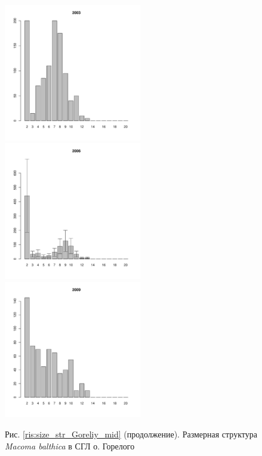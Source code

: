 \documentclass[12pt, a4paper]{article}
\begin{document}
\begin{figure}[h]
\begin{multicols}{3}
\hfill
\includegraphics[width=60mm]{../White_Sea/Luvenga_Goreliy/middle2_2003_.pdf}
\hfill
\includegraphics[width=60mm]{../White_Sea/Luvenga_Goreliy/middle2_2006_.pdf}
\hfill
\includegraphics[width=60mm]{../White_Sea/Luvenga_Goreliy/middle2_2009_.pdf}
\end{multicols}



\begin{center}
Рис. \ref{ris:size_str_Goreliy_mid} (продолжение). Размерная структура {\it Macoma balthica} в СГЛ о. Горелого

\end{center}
\end{figure}
\end{document}
